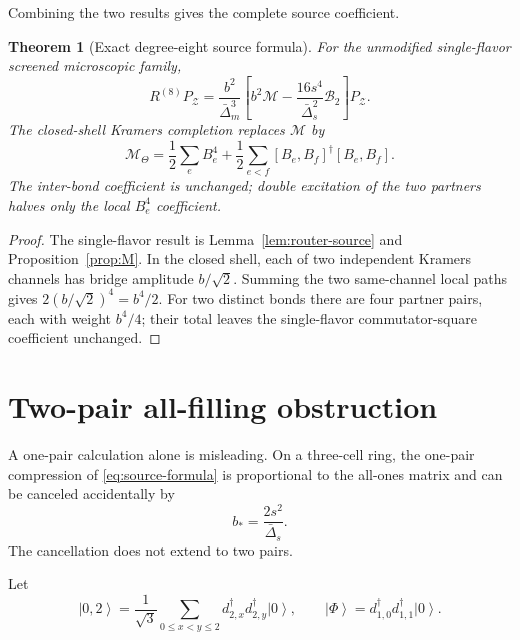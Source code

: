 \documentclass[11pt]{article}
\newtheorem{theorem}{Theorem}[section]
\theoremstyle{definition}
\theoremstyle{remark}
\newcommand{\cZ}{\mathcal Z}
\newcommand{\cM}{\mathcal M}
\newcommand{\cB}{\mathcal B}
\newcommand{\ket}[1]{\left|#1\right\rangle}
\begin{document}
Combining the two results gives the complete source coefficient.

\begin{theorem}[Exact degree-eight source formula]
\label{thm:source-formula}
For the unmodified single-flavor screened microscopic family,
\begin{equation}
 \boxed{
 R^{(8)}P_{\cZ}
 =\frac{b^2}{\bar\Delta_m^3}
 \left[b^2\cM-\frac{16s^4}{\bar\Delta_s^2}\cB_2\right]P_{\cZ}.}
 \label{eq:source-formula}
\end{equation}
The closed-shell Kramers completion replaces $\cM$ by
\begin{equation}
 \boxed{
 \cM_\Theta=\frac12\sum_eB_e^4+\frac12\sum_{e<f}
 [B_e,B_f]^\dagger[B_e,B_f].}
 \label{eq:Mtheta}
\end{equation}
The inter-bond coefficient is unchanged; double excitation of the two partners halves only the local $B_e^4$ coefficient.
\end{theorem}

\begin{proof}
The single-flavor result is Lemma~\ref{lem:router-source} and Proposition~\ref{prop:M}.  In the closed shell, each of two independent Kramers channels has bridge amplitude $b/\sqrt2$.  Summing the two same-channel local paths gives $2(b/\sqrt2)^4=b^4/2$.  For two distinct bonds there are four partner pairs, each with weight $b^4/4$; their total leaves the single-flavor commutator-square coefficient unchanged.
\end{proof}

\section{Two-pair all-filling obstruction}\label{sec:obstruction}

A one-pair calculation alone is misleading.  On a three-cell ring, the one-pair compression of \eqref{eq:source-formula} is proportional to the all-ones matrix and can be canceled accidentally by
\begin{equation}
 b_*=\frac{2s^2}{\bar\Delta_s}.
 \label{eq:bstar}
\end{equation}
The cancellation does not extend to two pairs.

Let
\begin{equation}
 \ket{0,2}=\frac1{\sqrt3}\sum_{0\le x<y\le2}
 d_{2,x}^\dagger d_{2,y}^\dagger\ket0,
 \qquad
 \ket\Phi=d_{1,0}^\dagger d_{1,1}^\dagger\ket0.
 \label{eq:witness-states}
\end{equation}
\end{document}
